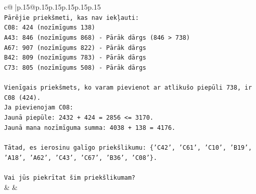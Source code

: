 \documentclass{article}
\begin{document}
{\begin{supertabular}{c@{$\;$}|p{.15\linewidth}@{}p{.15\linewidth}p{.15\linewidth}p{.15\linewidth}p{.15\linewidth}p{.15\linewidth}}
{{{\\ 
\texttt{Pārējie priekšmeti, kas nav iekļauti:} \\
\texttt{C08: 424 (nozīmīgums 138)} \\
\texttt{A43: 846 (nozīmīgums 868) {-} Pārāk dārgs (846 > 738)} \\
\texttt{A67: 907 (nozīmīgums 822) {-} Pārāk dārgs} \\
\texttt{B42: 809 (nozīmīgums 783) {-} Pārāk dārgs} \\
\texttt{C73: 805 (nozīmīgums 508) {-} Pārāk dārgs} \\
\\ 
\texttt{Vienīgais priekšmets, ko varam pievienot ar atlikušo piepūli 738, ir C08 (424).} \\
\texttt{Ja pievienojam C08:} \\
\texttt{Jaunā piepūle: 2432 + 424 = 2856 <= 3170.} \\
\texttt{Jaunā mana nozīmīguma summa: 4038 + 138 = 4176.} \\
\\ 
\texttt{Tātad, es ierosinu galīgo priekšlikumu: \{'C42', 'C61', 'C10', 'B19', 'A18', 'A62', 'C43', 'C67', 'B36', 'C08'\}.} \\
\\ 
\texttt{Vai jūs piekrītat šim priekšlikumam?} \\
            }
        }
    }
    & & \\ \\


\end{supertabular}}
\end{document}
